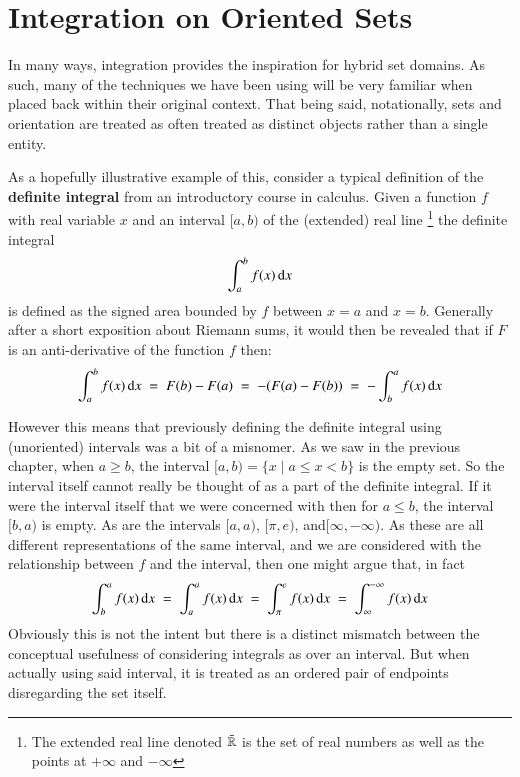 \chapter{Integration on Oriented Sets}
\label{chp:Integration}


%
%

In many ways, integration provides the inspiration for hybrid set domains.
As such, many of the techniques we have been using will be very familiar when placed back within their original context.
That being said, notationally, sets and orientation are treated as often treated as distinct objects rather than a single entity.


As a hopefully illustrative example of this, consider a typical definition of the \textbf{definite integral} from an introductory
course in calculus.
Given a function $f$ with real variable $x$ and an interval $[a,b)$ of the (extended) real line
\footnote{ The extended real line denoted $\bar{\mathbb{R}}$ is the set of real numbers as well as the points at 
$+\infty$ and $-\infty$} the definite integral
\begin{equation*}
	\int_a^b f(x) \mathop{}\!\mathrm{d} x
\end{equation*}
is defined as the signed area bounded by $f$ between $x=a$ and $x=b$.
Generally after a short exposition about Riemann sums, it would then be revealed that if $F$ is an anti-derivative of the
 function $f$ then:
\begin{equation*}
	\int_a^b f(x) \mathop{}\!\mathrm{d} x \;=\; F(b)-F(a) \;=\; - (F(a)-F(b)) \;=\; - \int_b^a f(x) \mathop{}\!\mathrm{d} x
\end{equation*}




However this means that previously defining the definite integral using (unoriented) intervals was a bit of a misnomer.
As we saw in the previous chapter, when $a \geq b$, the interval $[a,b) = \{ x \;|\; a \leq x < b \}$ is the empty set.
So the interval itself cannot really be thought of as a part of the definite integral.
If it were the interval itself that we were concerned with then for $a \leq b$, the interval $[b,a)$ is empty.
As are the intervals $[a,a)$, $[\pi, e)$, and$[\infty, -\infty)$.
As these are all different representations of the same interval, and we are considered with the relationship between $f$ and
the interval, then one might argue that, in fact
\begin{equation*}
	\int_b^a f(x) \mathop{}\!\mathrm{d} x \;=\; \int_a^a f(x) \mathop{}\!\mathrm{d} x \;=\; \int_\pi^e f(x)\mathop{}\!\mathrm{d} x \;=\; \int_\infty^{-\infty} f(x) \mathop{}\!\mathrm{d} x
\end{equation*}
Obviously this is not the intent but there is a distinct mismatch between the conceptual usefulness of considering
integrals as over an interval.
But when actually using said interval, it is treated as an ordered pair of endpoints disregarding the set itself.


